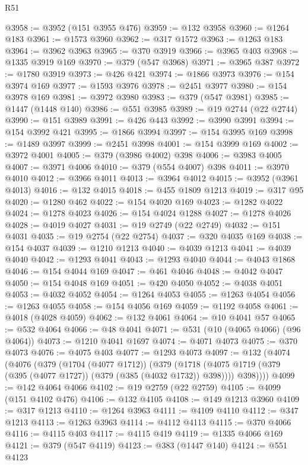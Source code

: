 \begin{lexlean}{R51}
\begin{coremodule}
@3958 := @3952 (@151 @3955 @476)
@3959 := @132 @3958
@3960 := @1264 @183
@3961 := @1573 @3960
@3962 := @317 @1572
@3963 := @1263 @183
@3964 := @3962 @3963
@3965 := @370 @3919
@3966 := @3965 @403
@3968 := @1335 @3919 @169
@3970 := @379 (@547 @3968)
@3971 := @3965 @387
@3972 := @1780 @3919
@3973 := @426 @421
@3974 := @1866 @3973
@3976 := @154 @3974 @169
@3977 := @1593 @3976
@3978 := @2451 @3977
@3980 := @154 @3978 @169
@3981 := @3972 @3980
@3983 := @379 (@547 @3981)
@3985 := @1447 (@1448 @140)
@3986 := @551 @3985
@3989 := @19 @2744 (@22 @2744)
@3990 := @151 @3989
@3991 := @426 @443
@3992 := @3990 @3991
@3994 := @154 @3992 @421
@3995 := @1866 @3994
@3997 := @154 @3995 @169
@3998 := @1489 @3997
@3999 := @2451 @3998
@4001 := @154 @3999 @169
@4002 := @3972 @4001
@4005 := @379 (@3986 @4002) @398
@4006 := @3983 @4005
@4007 := @3971 @4006
@4010 := @379 (@554 @4007) @398
@4011 := @3970 @4010
@4012 := @3966 @4011
@4013 := @3964 @4012
@4015 := @3952 (@3961 @4013)
@4016 := @132 @4015
@4018 := @455 @1809 @1213
@4019 := @317 @95
@4020 := @1280 @462
@4022 := @154 @4020 @169
@4023 := @1282 @4022
@4024 := @1278 @4023
@4026 := @154 @4024 @1288
@4027 := @1278 @4026
@4028 := @4019 @4027
@4031 := @19 @2749 (@22 @2749)
@4032 := @151 @4031
@4035 := @19 @2754 (@22 @2754)
@4037 := @320 @4035 @169
@4038 := @154 @4037
@4039 := @1210 @1213
@4040 := @4039 @1213
@4041 := @4039 @4040
@4042 := @1293 @4041
@4043 := @1293 @4040
@4044 := @4043 @1868
@4046 := @154 @4044 @169
@4047 := @461 @4046
@4048 := @4042 @4047
@4050 := @154 @4048 @169
@4051 := @420 @4050
@4052 := @4038 @4051
@4053 := @4032 @4052
@4054 := @1264 @4053
@4055 := @1263 @4054
@4056 := @1263 @4055
@4058 := @154 @4056 @169
@4059 := @1192 @4058
@4061 := @4018 (@4028 @4059)
@4062 := @132 @4061
@4064 := @10 @4041 @57
@4065 := @532 @4064
@4066 := @48 @4041
@4071 := @531 (@10 (@4065 @4066) (@96 @4064))
@4073 := @1210 @4041 @1697
@4074 := @4071 @4073
@4075 := @370 @4073
@4076 := @4075 @403
@4077 := @1293 @4073
@4097 := @132
    (@4074
      (@4076
        (@379
          (@1704 (@4077 @1712))
          (@379
            (@1718 (@4075 @1719 (@379 (@395 (@4077 @1727)) (@379 (@385 (@4032 @1732)) @398))))
            @398))))
@4099 := @142 @4064 @4066
@4102 := @19 @2759 (@22 @2759)
@4105 := @4099 (@151 @4102 @476)
@4106 := @132 @4105
@4108 := @149 @1213 @3960
@4109 := @317 @1213
@4110 := @1264 @3963
@4111 := @4109 @4110
@4112 := @347 @1213
@4113 := @1263 @3963
@4114 := @4112 @4113
@4115 := @370 @4066
@4116 := @4115 @403
@4117 := @4115 @419
@4119 := @1335 @4066 @169
@4121 := @379 (@547 @4119)
@4123 := @383 (@1447 @140)
@4124 := @551 @4123

\end{coremodule}
\end{lexlean}
